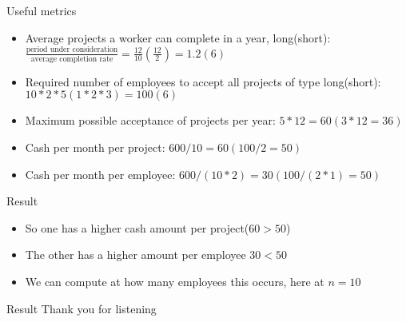 \documentclass{beamer}
\numberwithin{equation}{section}
\begin{document}
\begin{frame}{Useful metrics}
\begin{itemize}
    \item Average projects a worker can complete in a year, long(short): $ \frac{ \text{period under consideration}}{\text{average completion rate}}  = \frac{12}{10}(\frac{12}{2})=1.2(6)$
    \item Required number of employees to accept all projects of type long(short): $10*2*5(1*2*3)=100(6)$
    \item Maximum possible acceptance of projects per year: $5*12=60(3*12=36)$
    \item Cash per month per project: $600/10=60(100/2=50)$
    \item Cash per month per employee: $600/(10*2)=30 (100/(2*1)=50) $
\end{itemize}
\end{frame}

\begin{frame}{Result}
\begin{itemize}
    \item So one has a higher cash amount per project($60>50$)
    \item The other has a higher amount per employee  $30 <50 $
    \item We can compute at how many employees this occurs, here at $n=10$
\end{itemize}
\end{frame}

\begin{frame}{Result}
Thank you for listening
\end{frame}
\end{document}
